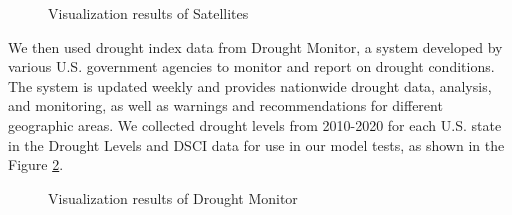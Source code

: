 \documentclass[12pt]{article}
\begin{document}
\begin{figure}[htb]
	\centering
	\caption{Visualization results of Satellites}
	\label{fig:visualization_satellites}
\end{figure}

We then used drought index data from Drought Monitor, a system developed by various U.S. government agencies to monitor and report on drought conditions. The system is updated weekly and provides nationwide drought data, analysis, and monitoring, as well as warnings and recommendations for different geographic areas. We collected drought levels from 2010-2020 for each U.S. state in the Drought Levels and DSCI data for use in our model tests, as shown in the Figure \ref{fig:visualization_data}.


\begin{figure}[htb]
	\centering
	\subfigure[Forrest]{
		
		\label{fig:forrest}
	}
	\subfigure[Grassland]{
		
		\label{fig:grassland}
	}
	\subfigure[Dessert]{
		
		\label{fig:dessert}
	}
	\caption{Visualization results of Drought Monitor}
	\label{fig:visualization_data}
\end{figure}
\end{document}
